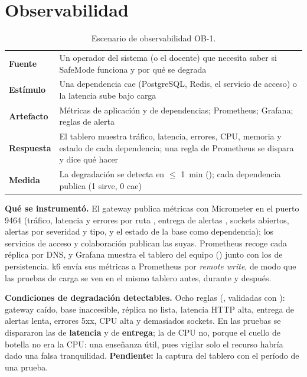 \section{Observabilidad}\label{sec:observabilidad}

\begin{table}[H]
\centering\small
\caption{Escenario de observabilidad OB-1.}\label{tab:ob1}
\begin{tabularx}{\textwidth}{lY}
\toprule
\textbf{Fuente} & Un operador del sistema (o el docente) que necesita saber si SafeMode funciona y por qué se degrada \\
\textbf{Estímulo} & Una dependencia cae (PostgreSQL, Redis, el servicio de acceso) o la latencia sube bajo carga \\
\textbf{Artefacto} & Métricas de aplicación y de dependencias; Prometheus; Grafana; reglas de alerta \\
\textbf{Respuesta} & El tablero muestra tráfico, latencia, errores, CPU, memoria y estado de cada dependencia; una regla de Prometheus se dispara y dice qué hacer \\
\textbf{Medida} & La degradación se detecta en $\leq$ 1~min (); cada dependencia publica  (1 sirve, 0 cae) \\
\bottomrule
\end{tabularx}
\end{table}

\textbf{Qué se instrumentó.} El gateway publica métricas con Micrometer en el puerto 9464 (tráfico, latencia y errores por ruta
, entrega de alertas , sockets abiertos, alertas por severidad y tipo, y
el estado de la base como dependencia); los servicios de acceso y colaboración publican las suyas. Prometheus recoge cada réplica por DNS, y Grafana
muestra el tablero del equipo () junto con los de persistencia. k6 envía sus métricas a
Prometheus por \emph{remote write}, de modo que las pruebas de carga se ven en el mismo tablero antes, durante y después.

\textbf{Condiciones de degradación detectables.} Ocho reglas (, validadas con ):
gateway caído, base inaccesible, réplica no lista, latencia HTTP alta, entrega de alertas lenta, errores 5xx, CPU alta y demasiados sockets. En las
pruebas se dispararon las de \textbf{latencia} y de \textbf{entrega}; la de CPU no, porque el cuello de botella no era la CPU: una enseñanza
útil, pues vigilar solo el recurso habría dado una falsa tranquilidad. \textbf{Pendiente:} la captura del tablero con el período de una prueba.

